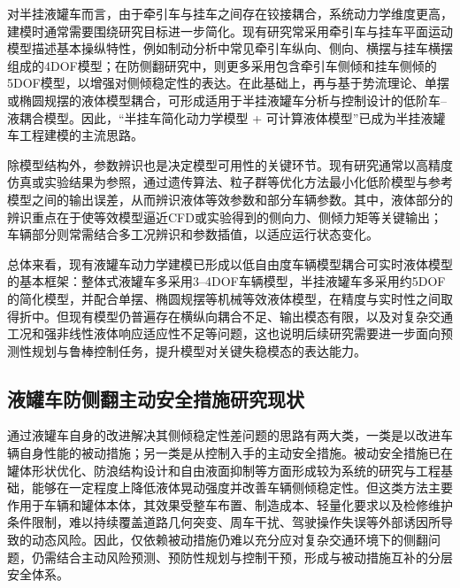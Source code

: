       对半挂液罐车而言，由于牵引车与挂车之间存在铰接耦合，系统动力学维度更高，建模时通常需要围绕研究目标进一步简化。现有研究常采用牵引车与挂车平面运动模型描述基本操纵特性，例如制动分析中常见牵引车纵向、侧向、横摆与挂车横摆组成的4DOF模型\cite{heren2016braking}；在防侧翻研究中，则更多采用包含牵引车侧倾和挂车侧倾的5DOF模型，以增强对侧倾稳定性的表达\cite{zongchangfu2014identification,niezhigen2015heavyduty}。在此基础上，再与基于势流理论、单摆或椭圆规摆的液体模型耦合，可形成适用于半挂液罐车分析与控制设计的低阶车--液耦合模型\cite{yuzhixin2018mpc,yuzhixin2019optimalcontrol}。因此，“半挂车简化动力学模型 + 可计算液体模型”已成为半挂液罐车工程建模的主流思路\cite{yuzhixin2018mpc,zongchangfu2014identification}。

      除模型结构外，参数辨识也是决定模型可用性的关键环节。现有研究通常以高精度仿真或实验结果为参照，通过遗传算法、粒子群等优化方法最小化低阶模型与参考模型之间的输出误差，从而辨识液体等效参数和部分车辆参数\cite{wanying2020antirolover,yudi2016nonfull,zongchangfu2014identification,niezhigen2015heavyduty}。其中，液体部分的辨识重点在于使等效模型逼近CFD或实验得到的侧向力、侧倾力矩等关键输出\cite{wanying2020antirolover,yudi2016nonfull}；车辆部分则常需结合多工况辨识和参数插值，以适应运行状态变化\cite{zongchangfu2014identification,niezhigen2015heavyduty}。

      总体来看，现有液罐车动力学建模已形成以低自由度车辆模型耦合可实时液体模型的基本框架：整体式液罐车多采用3--4DOF车辆模型，半挂液罐车多采用约5DOF的简化模型，并配合单摆、椭圆规摆等机械等效液体模型，在精度与实时性之间取得折中\cite{renyuanyuan2020precisemodel,wanying2020antirolover,yuzhixin2018mpc,yuzhixin2019optimalcontrol}。但现有模型仍普遍存在横纵向耦合不足、输出模态有限，以及对复杂交通工况和强非线性液体响应适应性不足等问题，这也说明后续研究需要进一步面向预测性规划与鲁棒控制任务，提升模型对关键失稳模态的表达能力。

  \subsection{液罐车防侧翻主动安全措施研究现状}
    通过液罐车自身的改进解决其侧倾稳定性差问题的思路有两大类，一类是以改进车辆自身性能的被动措施；另一类是从控制入手的主动安全措施。被动安全措施已在罐体形状优化\cite{chenyibao2016crosssection,quhuijun2017calculation,yudi2016nonfull,yudi2019rollstability,lixiansheng2015ga}、防浪结构设计\cite{hanyoubin2019vof,moreno2022davies,liukui2009braking,liukui2009steering}和自由液面抑制\cite{wangqiongyao2017sloshing}等方面形成较为系统的研究与工程基础，能够在一定程度上降低液体晃动强度并改善车辆侧倾稳定性。但这类方法主要作用于车辆和罐体本体，其效果受整车布置、制造成本、轻量化要求以及检修维护条件限制，难以持续覆盖道路几何突变、周车干扰、驾驶操作失误等外部诱因所导致的动态风险。因此，仅依赖被动措施仍难以充分应对复杂交通环境下的侧翻问题，仍需结合主动风险预测、预防性规划与控制干预，形成与被动措施互补的分层安全体系。

